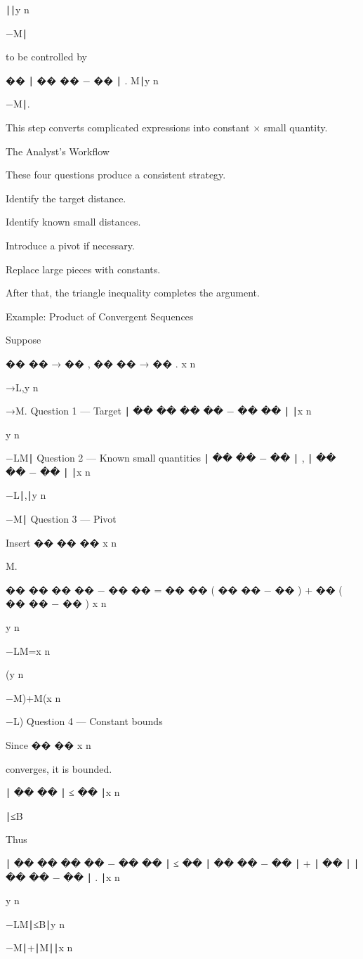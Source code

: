 ∣∣y
n
	​

−M∣

to be controlled by

��
∣
��
��
−
��
∣
.
M∣y
n
	​

−M∣.

This step converts complicated expressions into constant × small quantity.

The Analyst’s Workflow

These four questions produce a consistent strategy.

Identify the target distance.

Identify known small distances.

Introduce a pivot if necessary.

Replace large pieces with constants.

After that, the triangle inequality completes the argument.

Example: Product of Convergent Sequences

Suppose

��
��
→
��
,
��
��
→
��
.
x
n
	​

→L,y
n
	​

→M.
Question 1 — Target
∣
��
��
��
��
−
��
��
∣
∣x
n
	​

y
n
	​

−LM∣
Question 2 — Known small quantities
∣
��
��
−
��
∣
,
∣
��
��
−
��
∣
∣x
n
	​

−L∣,∣y
n
	​

−M∣
Question 3 — Pivot

Insert 
��
��
��
x
n
	​

M.

��
��
��
��
−
��
��
=
��
��
(
��
��
−
��
)
+
��
(
��
��
−
��
)
x
n
	​

y
n
	​

−LM=x
n
	​

(y
n
	​

−M)+M(x
n
	​

−L)
Question 4 — Constant bounds

Since 
��
��
x
n
	​

 converges, it is bounded.

∣
��
��
∣
≤
��
∣x
n
	​

∣≤B

Thus

∣
��
��
��
��
−
��
��
∣
≤
��
∣
��
��
−
��
∣
+
∣
��
∣
∣
��
��
−
��
∣
.
∣x
n
	​

y
n
	​

−LM∣≤B∣y
n
	​

−M∣+∣M∣∣x
n
	​

